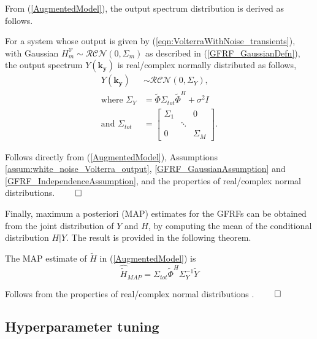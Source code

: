 From (\ref{AugmentedModel}), the output spectrum distribution is derived as follows.
\begin{thm}
For a system whose output is given by (\ref{eqn:VolterraWithNoise_transients}), with Gaussian $H_m^{\mathcal{V}} \sim \mathcal{RCN}(0,\Sigma_m)$ as described in (\ref{GFRF_GaussianDefn}), the output spectrum $Y(\mathbf{k_y})$ is real/complex normally distributed as follows,
\begin{equation}
\begin{split}
\label{OutputSpectrumThm}
Y(\mathbf{k_y}) &\sim \mathcal{RCN}(0,\Sigma_Y), \\
\text{where } \Sigma_Y &= \widetilde{\Phi}\Sigma_{tot} \widetilde{\Phi}^H + \sigma^2 I \\
\text{and } \Sigma_{tot} &= \begin{bmatrix} \Sigma_1 & &0 \\ & \ddots & \\ 0 & & \Sigma_M \end{bmatrix}.
\end{split}
\end{equation}
\end{thm}

\begin{proof*}
Follows directly from (\ref{AugmentedModel}), Assumptions \ref{assum:white_noise_Volterra_output}, \ref{GFRF_GaussianAssumption} and \ref{GFRF_IndependenceAssumption}, and the properties of real/complex normal distributions. \hfill $\qed$
\end{proof*}

Finally, maximum a posteriori (MAP) estimates for the GFRFs can be obtained from the joint distribution of $Y$ and $H$, by computing the mean of the conditional distribution $H|Y$. The result is provided in the following theorem.

\begin{thm}
The MAP estimate of $\widetilde{H}$ in (\ref{AugmentedModel}) is
\begin{equation}
\label{eqn:GFRF_MAP}
\hat{{\widetilde{H}}}_{MAP} = \Sigma_{tot} \widetilde{\Phi}^H \Sigma_Y^{-1} \widetilde{Y}
\end{equation}
\end{thm}

\begin{proof*}
Follows from the properties of real/complex normal distributions \cite{Lataire2016}. \hfill $\qed$
\end{proof*}

\subsection{Hyperparameter tuning}


